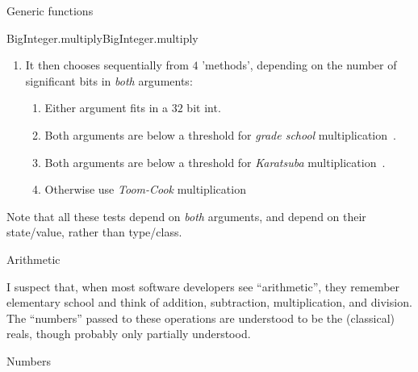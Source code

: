 \documentclass[12pt]{PalisadesLakesBook}
\begin{document}
\begin{plSection}{Generic functions}
\begin{plExample}{{\javaFont BigInteger.multiply}}{BigInteger.multiply}
\begin{enumerate}
\item It then chooses sequentially from $4$ 'methods', 
depending on the number of
significant bits in \textit{both} arguments:
\begin{enumerate}
  \item Either argument fits in a $32$ bit {\javaFont int}.
  \item Both arguments are below a threshold for
  \textit{grade school} 
  multiplication~\cite{wiki:GradeSchoolMultiplication}.
  \item Both arguments are below a threshold for 
  \textit{Karatsuba} multiplication~\cite{wiki:KaratsubaMultiplication}.
  \item Otherwise use \textit{Toom-Cook} 
  multiplication~\cite{wiki:ToomCookMultiplication}
 
\end{enumerate}
\end{enumerate}
Note that all these tests depend on \textit{both} arguments,
and depend on their state/value, rather than type/class.
\end{plExample}%

\end{plSection}%
\begin{plSection}{Arithmetic} 

I suspect that, when most software developers see ``arithmetic'',
they remember elementary school
and think of addition, subtraction, multiplication, and division.
The ``numbers'' passed to these operations are 
understood to be the (classical) reals, 
though probably only partially understood.


\end{plSection}%
\begin{plSection}{Numbers} 


\end{plSection}%
\end{document}
